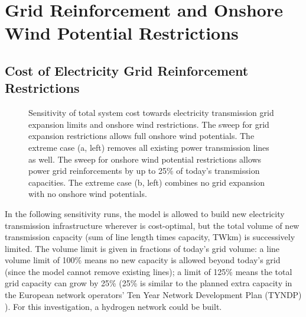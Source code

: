 \section{Grid Reinforcement and Onshore Wind Potential Restrictions}
\label{sec:si:sensitivity-lv-onw}

\subsection{Cost of Electricity Grid Reinforcement Restrictions}
\label{sec:si:lv}

\begin{figure}
    \centering
    \caption{Sensitivity of total system cost towards electricity transmission grid expansion limits and onshore wind restrictions.
    The sweep for grid expansion restrictions allows full onshore wind potentials.
    The extreme case (a, left) removes all existing power transmission lines as well.
    The sweep for onshore wind potential restrictions allows power grid reinforcements by up to 25\% of today's transmission capacities.
    The extreme case (b, left) combines no grid expansion with no onshore wind potentials.}

    \label{fig:lv-onw-restriction}
\end{figure}

In the following sensitivity runs, the model is allowed to build new electricity
transmission infrastructure wherever is cost-optimal, but the total volume of
new transmission capacity (sum of line length times capacity, TWkm) is
successively limited. The volume limit is given in fractions of today's grid
volume: a line volume limit of 100\% means no new capacity is allowed beyond
today's grid (since the model cannot remove existing lines); a limit of 125\%
means the total grid capacity can grow by 25\% (25\% is similar to the planned
extra capacity in the European network operators' Ten Year Network Development
Plan (TYNDP) ). For this investigation, a hydrogen network
could be built.

